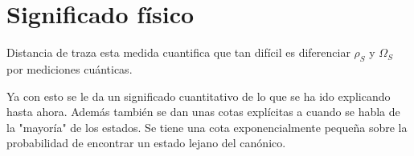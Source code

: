 \section{Significado físico}

Distancia de traza esta medida cuantifica que tan difícil es diferenciar $\rho_{S}$ y $\Omega_{S}$ por mediciones cuánticas.

Ya con esto se le da un significado cuantitativo de lo que se ha ido explicando hasta ahora. Además también se dan unas cotas explícitas a cuando se habla de la "mayoría" de los estados. Se tiene una cota exponencialmente pequeña  sobre la probabilidad de encontrar un estado lejano del canónico.\\ %





